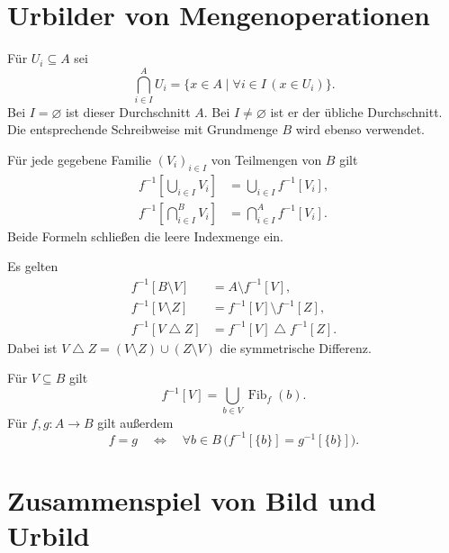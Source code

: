 \section{Urbilder von Mengenoperationen}

\begin{definition}
Für $U_i\subseteq A$ sei
\[
 \bigcap_{i\in I}^{A}U_i
   =\{x\in A\mid\forall i\in I\,(x\in U_i)\}.
\]
Bei $I=\varnothing$ ist dieser Durchschnitt $A$.
Bei $I\ne\varnothing$ ist er der übliche Durchschnitt.
Die entsprechende Schreibweise mit Grundmenge $B$ wird ebenso verwendet.
\end{definition}

\begin{theorem}
\label{b05guide:thm:preimagefamilies}
Für jede gegebene Familie $(V_i)_{i\in I}$ von Teilmengen von $B$ gilt
\[
 \begin{aligned}
 f^{-1}\left[\bigcup_{i\in I}V_i\right]
   &=\bigcup_{i\in I}f^{-1}[V_i],\\
 f^{-1}\left[\bigcap_{i\in I}^{B}V_i\right]
   &=\bigcap_{i\in I}^{A}f^{-1}[V_i].
 \end{aligned}
\]
Beide Formeln schließen die leere Indexmenge ein.
\end{theorem}

\begin{theorem}
\label{b05guide:thm:preimageboolean}
Es gelten
\[
 \begin{aligned}
 f^{-1}[B\setminus V]&=A\setminus f^{-1}[V],\\
 f^{-1}[V\setminus Z]&=f^{-1}[V]\setminus f^{-1}[Z],\\
 f^{-1}[V\mathbin{\triangle}Z]
   &=f^{-1}[V]\mathbin{\triangle}f^{-1}[Z].
 \end{aligned}
\]
Dabei ist $V\mathbin{\triangle}Z=(V\setminus Z)\cup(Z\setminus V)$
die symmetrische Differenz.
\end{theorem}

\begin{theorem}
\label{b05guide:thm:preimagefibers}
Für $V\subseteq B$ gilt
\[
 f^{-1}[V]=\bigcup_{b\in V}\operatorname{Fib}_f(b).
\]
Für $f,g\colon A\to B$ gilt außerdem
\[
 f=g\quad\Longleftrightarrow\quad
 \forall b\in B\,\bigl(f^{-1}[\{b\}]=g^{-1}[\{b\}]\bigr).
\]
\end{theorem}

\section{Zusammenspiel von Bild und Urbild}

